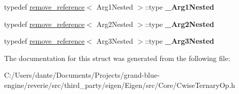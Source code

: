 \begin{DoxyCompactItemize}
typedef \mbox{\hyperlink{struct_eigen_1_1internal_1_1remove__reference}{remove\+\_\+reference}}$<$ Arg1\+Nested $>$\+::type {\bfseries \+\_\+\+Arg1\+Nested}
\item 
\mbox{\label{struct_eigen_1_1internal_1_1traits_3_01_cwise_ternary_op_3_01_ternary_op_00_01_arg1_00_01_arg2_00_01_arg3_01_4_01_4_ad3221c7291ce3aeb4fee113040a253e3}} 
typedef \mbox{\hyperlink{struct_eigen_1_1internal_1_1remove__reference}{remove\+\_\+reference}}$<$ Arg2\+Nested $>$\+::type {\bfseries \+\_\+\+Arg2\+Nested}
\item 
\mbox{\label{struct_eigen_1_1internal_1_1traits_3_01_cwise_ternary_op_3_01_ternary_op_00_01_arg1_00_01_arg2_00_01_arg3_01_4_01_4_a8661ddba074cfb332a97398a01cdb0bb}} 
typedef \mbox{\hyperlink{struct_eigen_1_1internal_1_1remove__reference}{remove\+\_\+reference}}$<$ Arg3\+Nested $>$\+::type {\bfseries \+\_\+\+Arg3\+Nested}
\end{DoxyCompactItemize}


The documentation for this struct was generated from the following file\+:\begin{DoxyCompactItemize}
\item 
C\+:/\+Users/dante/\+Documents/\+Projects/grand-\/blue-\/engine/reverie/src/third\+\_\+party/eigen/\+Eigen/src/\+Core/Cwise\+Ternary\+Op.\+h\end{DoxyCompactItemize}
